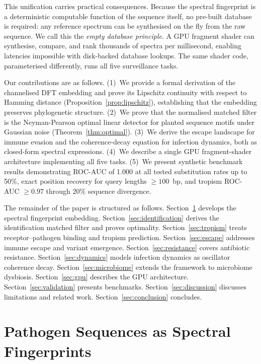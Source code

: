 \documentclass[twocolumn,11pt,a4paper]{article}
\theoremstyle{definition}
\theoremstyle{remark}
\begin{document}
This unification carries practical consequences. Because the spectral
fingerprint is a deterministic computable function of the sequence itself, no
pre-built database is required: any reference spectrum can be synthesised on the
fly from the raw sequence. We call this the \emph{empty database principle}. A
GPU fragment shader can synthesise, compare, and rank thousands of spectra per
millisecond, enabling latencies impossible with disk-backed database lookups.
The same shader code, parameterised differently, runs all five surveillance
tasks.

Our contributions are as follows. (1)~We provide a formal derivation of the
channelised DFT embedding and prove its Lipschitz continuity with respect to
Hamming distance (Proposition~\ref{prop:lipschitz}), establishing that the
embedding preserves phylogenetic structure. (2)~We prove that the normalised
matched filter is the Neyman-Pearson optimal linear detector for planted sequence
motifs under Gaussian noise (Theorem~\ref{thm:optimal}). (3)~We derive the
escape landscape for immune evasion and the coherence-decay equation for
infection dynamics, both as closed-form spectral expressions. (4)~We describe
a single GPU fragment-shader architecture implementing all five tasks.
(5)~We present synthetic benchmark results demonstrating ROC-AUC of 1.000 at
all tested substitution rates up to 50\%, exact position recovery for query
lengths $\geq 100$~bp, and tropism ROC-AUC $\geq 0.97$ through 20\% sequence
divergence.

The remainder of the paper is structured as follows.
Section~\ref{sec:fingerprint} develops the spectral fingerprint embedding.
Section~\ref{sec:identification} derives the identification matched filter and
proves optimality. Section~\ref{sec:tropism} treats receptor--pathogen binding
and tropism prediction. Section~\ref{sec:escape} addresses immune escape and
variant emergence. Section~\ref{sec:resistance} covers antibiotic resistance.
Section~\ref{sec:dynamics} models infection dynamics as oscillator coherence
decay. Section~\ref{sec:microbiome} extends the framework to microbiome
dysbiosis. Section~\ref{sec:gpu} describes the GPU architecture.
Section~\ref{sec:validation} presents benchmarks. Section~\ref{sec:discussion}
discusses limitations and related work. Section~\ref{sec:conclusion} concludes.

\section{Pathogen Sequences as Spectral Fingerprints}
\label{sec:fingerprint}
\end{document}
